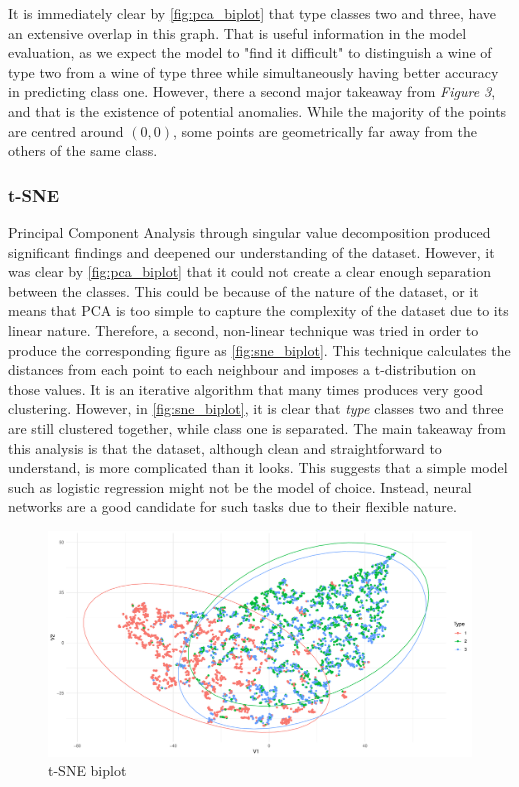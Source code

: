 \documentclass[11pt,twoside]{article}
\numberwithin{Theorem}{section}
\numberwithin{Definition}{section}
\numberwithin{Lemma}{section}
\numberwithin{Algorithm}{section}
\numberwithin{equation}{section}
\begin{document}
\vspace{2em}
It is immediately clear by \autoref{fig:pca_biplot} that \textsf{type} classes two and three, have an extensive overlap in this graph. That is useful information in the model evaluation, as we expect the model to "find it difficult" to distinguish a wine of type two from a wine of type three while simultaneously having better accuracy in predicting class one. However, there a second major takeaway from \textit{Figure 3}, and that is the existence of potential anomalies. While the majority of the points are centred around $(0,0)$, some points are geometrically far away from the others of the same class.
\subsubsection{t-SNE}
\label{sec:tsne}
Principal Component Analysis through singular value decomposition produced significant findings and deepened our understanding of the dataset. However, it was clear by \autoref{fig:pca_biplot} that it could not create a clear enough separation between the classes. This could be because of the nature of the dataset, or it means that PCA is too simple to capture the complexity of the dataset due to its linear nature.
Therefore, a second, non-linear \cite{van2008visualizing} technique was tried in order to produce the corresponding figure as \autoref{fig:sne_biplot}. This technique calculates the distances from each point to each neighbour and imposes a t-distribution on those values. It is an iterative algorithm that many times produces very good clustering. However, in \autoref{fig:sne_biplot}, it is clear that \textit{type} classes two and three are still clustered together, while class one is separated.
The main takeaway from this analysis is that the dataset, although clean and straightforward to understand, is more complicated than it looks. This suggests that a simple model such as logistic regression might not be the model of choice. Instead, neural networks are a good candidate for such tasks due to their flexible nature.
\vspace*{1em}
\begin{figure}[!h]
\centering
\includegraphics[width=\textwidth]{./output/1.d.t-sne.pdf}
\caption{t-SNE biplot}
\label{fig:sne_biplot}
\end{figure}
\vspace{2em}
\end{document}
